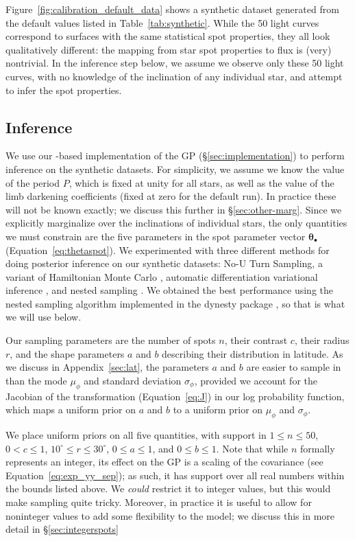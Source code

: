 \documentclass[modern]{aastex62}
\begin{document}
Figure~\ref{fig:calibration_default_data} shows a synthetic dataset generated
from the default values listed in Table~\ref{tab:synthetic}. While the 50
light curves correspond to surfaces with the same statistical spot properties,
they all look qualitatively different: the mapping from star spot properties
to flux is (very) nontrivial. In the inference step below, we assume we observe
only these 50 light curves, with no knowledge of the inclination of any individual
star, and attempt to infer the spot properties.

\subsection{Inference}
\label{sec:calibration-inference}
We use our \Python-based implementation of the GP (\S\ref{sec:implementation})
to perform inference on the synthetic datasets. For simplicity, we assume we
know the value of the period $P$, which is fixed at unity for all stars, as well
as the value of the limb darkening coefficients (fixed at zero for the default
run). In practice these will not be known exactly; we discuss this further in
\S\ref{sec:other-marg}. Since we explicitly marginalize over the inclinations
of individual stars, the only quantities we must constrain are the five
parameters in the spot parameter vector $\pmb{\theta}_\bullet$
(Equation~\ref{eq:thetaspot}). We experimented with three different methods
for doing posterior inference on our synthetic datasets: No-U Turn Sampling,
a variant of Hamiltonian Monte Carlo
\citep[NUTS;][]{?}, automatic differentiation
variational inference \citep[ADVI;][]{?}, and nested sampling \citep{Skilling2004,Skilling2006}.
We obtained the best performance using the nested sampling algorithm
implemented in the \textsf{dynesty} package \citep{Speagle2020}, so that is what
we will use below.

Our sampling parameters are the number of spots $n$, their contrast $c$,
their radius $r$, and the shape parameters $a$ and $b$ describing their
distribution in latitude. As we discuss in Appendix~\ref{sec:lat},
the parameters $a$ and $b$ are easier to sample in than
the mode $\mu_\phi$ and standard deviation $\sigma_\phi$, provided we
account for the Jacobian of the transformation (Equation~\ref{eq:J})
in our log probability function, which maps a uniform prior on $a$ and $b$
to a uniform prior on $\mu_\phi$ and $\sigma_\phi$.

We place uniform priors on all five quantities, with support in
$1 \leq n \leq 50$, $0 < c \leq 1$,
$10^\circ \leq r \leq 30^\circ$,
$0 \leq a \leq 1$, and
$0 \leq b \leq 1$. Note that while $n$ formally represents an integer,
its effect on the GP is a scaling of the covariance (see Equation~\ref{eq:exp_yy_sep});
as such, it has support over all real numbers within the bounds listed
above. We \emph{could} restrict it to integer values, but this would make
sampling quite tricky. Moreover, in practice it is useful to allow for
noninteger values to add some flexibility to the model; we discuss this
in more detail in \S\ref{sec:integerspots}
\end{document}
